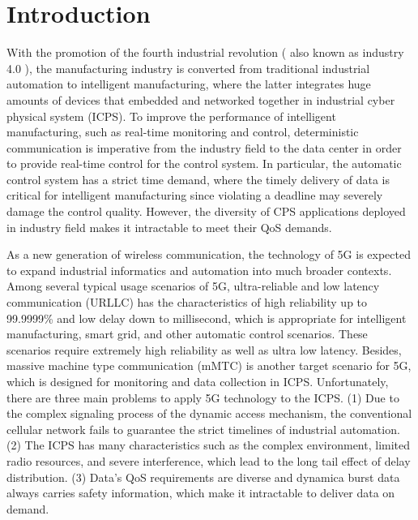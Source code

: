 \documentclass{SCIS2021}
\begin{document}
	
	\maketitle
	
	
	\section{Introduction}
	\label{sec:introduction}
	{\color{blue}With the promotion of the fourth industrial revolution ( also known as industry 4.0 ), the manufacturing industry is converted from traditional industrial automation to intelligent manufacturing, where the latter integrates huge amounts of devices that embedded and networked together in industrial cyber physical system (ICPS)\cite{zhou2021temperature}. To improve the performance of intelligent manufacturing, such as real-time monitoring and control, deterministic communication is imperative from the industry field to the data center in order to provide real-time control for the control system. In particular, the automatic control system has a strict time demand, where the timely delivery of data is critical for intelligent manufacturing since violating a deadline may severely damage the control quality. However, the diversity of CPS applications deployed in industry field makes it intractable to meet their QoS demands\cite{zhou2020siamese}.}
	
	
	\par As a new generation of wireless communication, the technology of 5G is expected to expand industrial informatics and automation into much broader contexts\cite{li2018predictive}. {\color{black}Among several typical usage} scenarios of 5G, ultra-reliable and low latency communication (URLLC) has the characteristics of high reliability up to 99.9999\% and low delay down to millisecond\cite{li2019learning}, which is appropriate for intelligent manufacturing, smart grid, and other automatic control scenarios. These scenarios require extremely high reliability {\color{black}as well as ultra low latency}. Besides, massive machine type communication (mMTC) is another target scenario for 5G, which is designed for monitoring and data collection in {\color{black}ICPS}. Unfortunately, there are three main problems to apply 5G technology to the {\color{black}ICPS}. (1) Due to the complex signaling process of the dynamic access mechanism, the conventional cellular network fails to guarantee the strict timelines of industrial automation. (2) The {\color{black}ICPS} has many characteristics such as the complex environment, limited radio resources, and severe interference, which lead to the long tail effect of delay distribution. (3) Data's QoS requirements are diverse and {\color{black}dynamica burst data always carries safety information}, which make it intractable to deliver data on demand.
	
\end{document}
